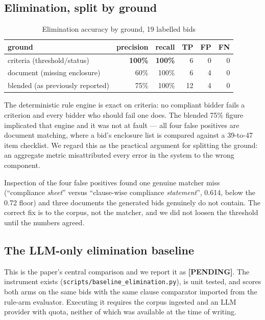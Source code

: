 \documentclass[conference]{IEEEtran}
\begin{document}
\subsection{Elimination, split by ground}

\begin{table}[htbp]
\caption{Elimination accuracy by ground, 19 labelled bids}
\label{tab:elim}
\centering
\begin{tabular}{@{}lrrrrr@{}}
\toprule
ground & precision & recall & TP & FP & FN \\
\midrule
criteria (threshold/status) & \textbf{100\%} & \textbf{100\%} & 6 & 0 & 0 \\
document (missing enclosure) & 60\% & 100\% & 6 & 4 & 0 \\
blended (as previously reported) & 75\% & 100\% & 12 & 4 & 0 \\
\bottomrule
\end{tabular}
\end{table}

The deterministic rule engine is exact on criteria: no compliant bidder fails a
criterion and every bidder who should fail one does. The blended 75\% figure
implicated that engine and it was not at fault --- all four false positives are
document matching, where a bid's enclosure list is compared against a 39-to-47
item checklist. We regard this as the practical argument for splitting the
ground: an aggregate metric misattributed every error in the system to the
wrong component.

Inspection of the four false positives found one genuine matcher miss
(``compliance \emph{sheet}'' versus ``clause-wise compliance \emph{statement}'',
0.614, below the 0.72 floor) and three documents the generated bids genuinely do
not contain. The correct fix is to the corpus, not the matcher, and we did not
loosen the threshold until the numbers agreed.

\subsection{The LLM-only elimination baseline}

This is the paper's central comparison and we report it as \textbf{[PENDING]}.
The instrument exists (\texttt{scripts/baseline\_elimination.py}), is unit
tested, and scores both arms on the same bids with the same clause comparator
imported from the rule-arm evaluator. Executing it requires the corpus ingested
and an LLM provider with quota, neither of which was available at the time of
writing.
\end{document}
